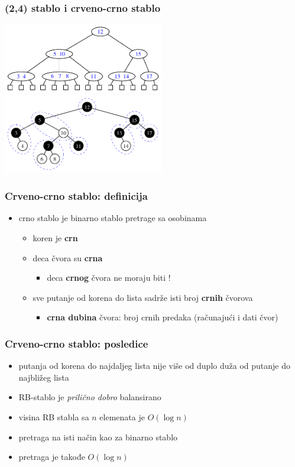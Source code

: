 \documentclass[compress]{beamer}
\begin{document}
\begin{frame}[fragile]
  \frametitle{(2,4) stablo i crveno-crno stablo}
  \begin{center}
    \includegraphics[width=7cm]{asp-11-pic30.pdf} \\
    \includegraphics[width=7cm]{asp-11-pic38.pdf}
  \end{center}
\end{frame}

\begin{frame}[fragile]
  \frametitle{Crveno-crno stablo: definicija}
  \begin{itemize}
    \item {}crno stablo je binarno stablo pretrage sa osobinama
    \begin{itemize}
      \item koren je \textbf{crn}
      \item deca \textbf{} čvora su \textbf{crna}
      \begin{itemize}
        \item deca \textbf{crnog} čvora ne moraju biti \textbf{}!
      \end{itemize}
      \item sve putanje od korena do lista sadrže isti broj \textbf{crnih} čvorova
      \begin{itemize}
        \item \textbf{crna dubina} čvora: broj crnih predaka (računajući i dati čvor)
      \end{itemize}
    \end{itemize}
  \end{itemize}
\end{frame}

\begin{frame}[fragile]
  \frametitle{Crveno-crno stablo: posledice}
  \begin{itemize}
    \item putanja od korena do najdaljeg lista nije više od duplo duža od putanje do najbližeg lista
    \item RB-stablo je \textit{prilično dobro} balansirano
    \item visina RB stabla sa $n$ elemenata je $O(\log n)$
    \item pretraga na isti način kao za binarno stablo
    \item pretraga je takođe $O(\log n)$
  \end{itemize}
\end{frame}
\end{document}
